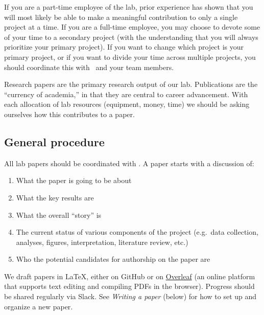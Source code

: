 \documentclass{tufte-book} %
\begin{document}
If you are a part-time employee of the lab, prior experience has shown
that you will most likely be able to make a meaningful contribution to
only a single project at a time.  If you are a full-time employee, you
may choose to devote some of your time to a secondary project (with
the understanding that you will always prioritize your primary
project).  If you want to change which project is your primary
project, or if you want to divide your time across multiple projects,
you should coordinate this with \director~and your team members.

\label{sec:papers}

\noindent Research papers are the primary research output of our lab.
Publications are the ``currency of academia,'' in that they are
central to career advancement.  With each allocation of lab resources
(equipment, money, time) we should be asking ourselves how this
contributes to a paper.

\subsection{General procedure}
All lab papers should be coordinated with \director.  A paper starts
with a discussion of:
\begin{enumerate}
\item What the paper is going to be about
\item What the key results are
\item What the overall ``story'' is
\item The current status of various components of the project
  (e.g.\ data collection, analyses, figures, interpretation,
  literature review, etc.)
\item Who the potential candidates for authorship on the paper are
\end{enumerate}

We draft papers in \LaTeX, either on GitHub or on
\href{https://www.overleaf.com/}{Overleaf} (an online platform that
supports text editing and compiling PDFs in the browser).  Progress
should be shared regularly via Slack.  See \textit{Writing a paper}
(below) for how to set up and organize a new paper.
\end{document}
